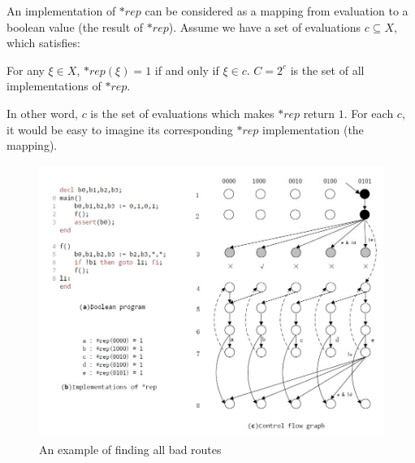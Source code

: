 An implementation of $*rep$ can be considered as a mapping from evaluation to a boolean value (the result of $*rep$). Assume we have a set of evaluations $c \subseteq X$, which satisfies:
\begin{definition}
For any $\xi \in X$, $*rep(\xi) = 1$ if and only if $\xi \in c$. $C = 2^{c}$ is the set of all implementations of $*rep$.
\end{definition}
In other word, $c$ is the set of evaluations which makes $*rep$ return $1$. For each $c$, it would be easy to imagine its corresponding $*rep$ implementation (the mapping).

\begin{figure}
\centering
\includegraphics[width=5in,height=3.5in]{Fig3-2.jpg}
\caption{An example of finding all bad routes}
\label{fig:FBR}
\end{figure}

